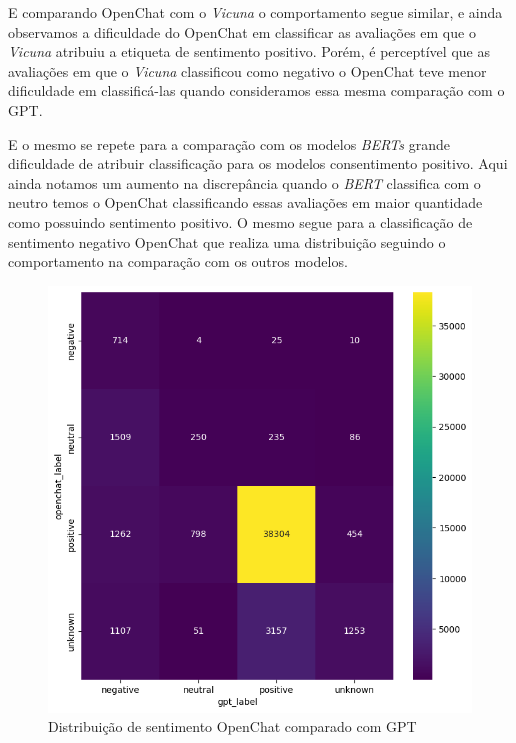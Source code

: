 E comparando OpenChat com o \textit{Vicuna} o comportamento segue similar, e ainda observamos a dificuldade do OpenChat em classificar as avaliações em que o \textit{Vicuna} atribuiu a etiqueta de sentimento positivo. Porém, é perceptível que as avaliações em  que o \textit{Vicuna} classificou como negativo o OpenChat teve menor dificuldade em classificá-las quando consideramos essa mesma comparação com o GPT.

E o mesmo se repete para a comparação com os modelos \textit{BERTs} grande dificuldade de atribuir classificação para os modelos consentimento positivo. Aqui ainda notamos um aumento na discrepância quando o \textit{BERT} classifica com o neutro temos o OpenChat classificando essas avaliações em maior quantidade como possuindo sentimento positivo. O mesmo segue para a classificação de sentimento negativo OpenChat que realiza uma distribuição seguindo o comportamento na comparação com os outros modelos.

\begin{figure}
	\centering
	\includegraphics[width=.8\textwidth]{figs/openchat/heat_vs_gpt.png}
	\caption{Distribuição de sentimento OpenChat comparado com GPT}
	\label{img:heat_openchat_vs_gpt}
\end{figure}

